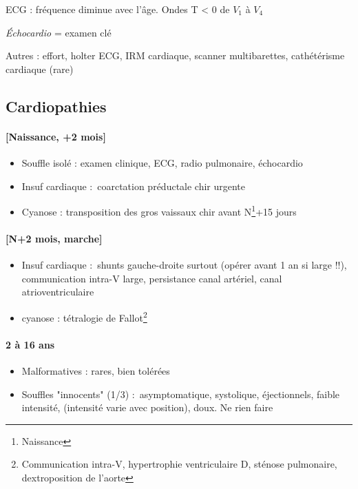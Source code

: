 \documentclass{article}
\begin{document}
ECG : fréquence diminue avec l'âge. Ondes T < 0 de $V_1$ à $V_4$

\textit{Échocardio} = examen clé

Autres : effort, holter ECG, IRM cardiaque, scanner multibarettes, cathétérisme
cardiaque (rare)

\subsection{Cardiopathies}
\paragraph{[Naissance, +2 mois]}
\begin{itemize}
  \item Souffle isolé : examen clinique, ECG, radio pulmonaire, échocardio
  \item Insuf cardiaque : coarctation préductale \thus chir urgente
  \item Cyanose : transposition des gros vaissaux \thus chir avant N\footnote{Naissance}+15 jours
\end{itemize}

\paragraph{[N+2 mois, marche]}
\begin{itemize}
  \item Insuf cardiaque : shunts gauche-droite surtout (\thus opérer avant 1 an
    si large !!), communication intra-V
    large, persistance canal artériel, canal atrioventriculaire
  \item cyanose : tétralogie de Fallot\footnote{Communication intra-V,
      hypertrophie ventriculaire D, sténose pulmonaire, dextroposition de
    l'aorte}
\end{itemize}
\paragraph{2 à 16 ans}
\begin{itemize}
  \item Malformatives : rares, bien tolérées
  \item Souffles "innocents" (1/3) : asymptomatique, systolique, éjectionnels,
    faible intensité, (intensité varie avec position), doux. Ne rien faire
\end{itemize}
\end{document}
